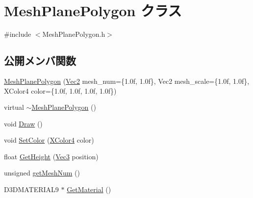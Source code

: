 \hypertarget{class_mesh_plane_polygon}{}\section{Mesh\+Plane\+Polygon クラス}
\label{class_mesh_plane_polygon}


{\ttfamily \#include $<$Mesh\+Plane\+Polygon.\+h$>$}

\subsection*{公開メンバ関数}
\begin{DoxyCompactItemize}
\item 
\mbox{\hyperlink{class_mesh_plane_polygon_a7db07104974799895b42997c71ba8d3e}{Mesh\+Plane\+Polygon}} (\mbox{\hyperlink{_vector3_d_8h_a5ef6e95dfc5f9d3820b71772d99bbc25}{Vec2}} mesh\+\_\+num=\{1.\+0f, 1.\+0f\}, Vec2 mesh\+\_\+scale=\{1.\+0f, 1.\+0f\}, X\+Color4 color=\{1.\+0f, 1.\+0f, 1.\+0f, 1.\+0f\})
\item 
virtual \mbox{\hyperlink{class_mesh_plane_polygon_a6c76a24c3f35cd9a77e6947c22fa4c3d}{$\sim$\+Mesh\+Plane\+Polygon}} ()
\item 
void \mbox{\hyperlink{class_mesh_plane_polygon_a813d5d6897ec0ce2b672cd6e1360e281}{Draw}} ()
\item 
void \mbox{\hyperlink{class_mesh_plane_polygon_a514e1738386a6a4be0d37ea38bd425f2}{Set\+Color}} (\mbox{\hyperlink{_vector3_d_8h_a680c30c4a07d86fe763c7e01169cd6cc}{X\+Color4}} color)
\item 
float \mbox{\hyperlink{class_mesh_plane_polygon_ac04d763b16a962f00c99e3354e45f320}{Get\+Height}} (\mbox{\hyperlink{_vector3_d_8h_ab16f59e4393f29a01ec8b9bbbabbe65d}{Vec3}} position)
\item 
unsigned \mbox{\hyperlink{class_mesh_plane_polygon_a1850ae9039b99d29b709b17224b49fa5}{get\+Mesh\+Num}} ()
\item 
D3\+D\+M\+A\+T\+E\+R\+I\+A\+L9 $\ast$ \mbox{\hyperlink{class_mesh_plane_polygon_a1188cf0072e000227ecce6210ba2778c}{Get\+Material}} ()
\end{DoxyCompactItemize}
